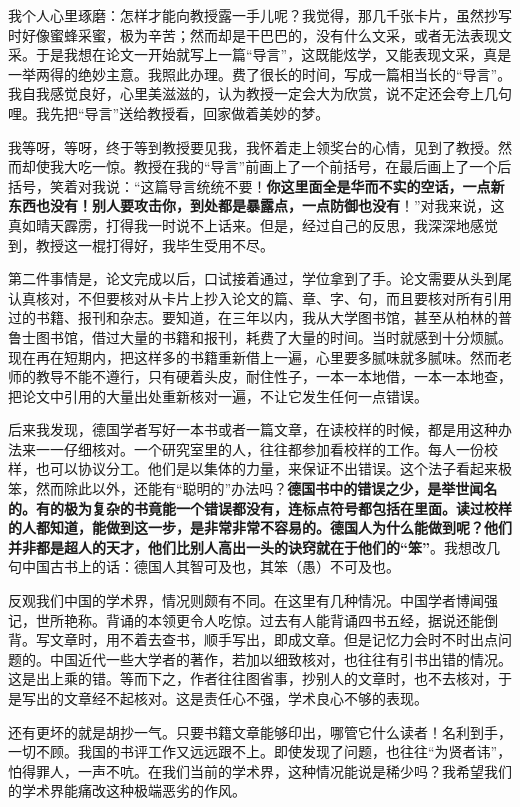 \documentclass[UTF8,a4paper,8pt]{ctexbook}
\begin{document}
		我个人心里琢磨：怎样才能向教授露一手儿呢？我觉得，那几千张卡片，虽然抄写时好像蜜蜂采蜜，极为辛苦；然而却是干巴巴的，没有什么文采，或者无法表现文采。于是我想在论文一开始就写上一篇“导言”，这既能炫学，又能表现文采，真是一举两得的绝妙主意。我照此办理。费了很长的时间，写成一篇相当长的“导言”。我自我感觉良好，心里美滋滋的，认为教授一定会大为欣赏，说不定还会夸上几句哩。我先把“导言”送给教授看，回家做着美妙的梦。
		
		我等呀，等呀，终于等到教授要见我，我怀着走上领奖台的心情，见到了教授。然而却使我大吃一惊。教授在我的“导言”前画上了一个前括号，在最后画上了一个后括号，笑着对我说：“这篇导言统统不要！\textbf{你这里面全是华而不实的空话，一点新东西也没有！别人要攻击你，到处都是暴露点，一点防御也没有}！”对我来说，这真如晴天霹雳，打得我一时说不上话来。但是，经过自己的反思，我深深地感觉到，教授这一棍打得好，我毕生受用不尽。
		
		第二件事情是，论文完成以后，口试接着通过，学位拿到了手。论文需要从头到尾认真核对，不但要核对从卡片上抄入论文的篇、章、字、句，而且要核对所有引用过的书籍、报刊和杂志。要知道，在三年以内，我从大学图书馆，甚至从柏林的普鲁士图书馆，借过大量的书籍和报刊，耗费了大量的时间。当时就感到十分烦腻。现在再在短期内，把这样多的书籍重新借上一遍，心里要多腻味就多腻味。然而老师的教导不能不遵行，只有硬着头皮，耐住性子，一本一本地借，一本一本地查，把论文中引用的大量出处重新核对一遍，不让它发生任何一点错误。
		
		后来我发现，德国学者写好一本书或者一篇文章，在读校样的时候，都是用这种办法来一一仔细核对。一个研究室里的人，往往都参加看校样的工作。每人一份校样，也可以协议分工。他们是以集体的力量，来保证不出错误。这个法子看起来极笨，然而除此以外，还能有“聪明的”办法吗？\textbf{德国书中的错误之少，是举世闻名的。有的极为复杂的书竟能一个错误都没有，连标点符号都包括在里面。读过校样的人都知道，能做到这一步，是非常非常不容易的。德国人为什么能做到呢？他们并非都是超人的天才，他们比别人高出一头的诀窍就在于他们的“笨”}。我想改几句中国古书上的话：德国人其智可及也，其笨（愚）不可及也。
		
		反观我们中国的学术界，情况则颇有不同。在这里有几种情况。中国学者博闻强记，世所艳称。背诵的本领更令人吃惊。过去有人能背诵四书五经，据说还能倒背。写文章时，用不着去查书，顺手写出，即成文章。但是记忆力会时不时出点问题的。中国近代一些大学者的著作，若加以细致核对，也往往有引书出错的情况。这是出上乘的错。等而下之，作者往往图省事，抄别人的文章时，也不去核对，于是写出的文章经不起核对。这是责任心不强，学术良心不够的表现。
		
		还有更坏的就是胡抄一气。只要书籍文章能够印出，哪管它什么读者！名利到手，一切不顾。我国的书评工作又远远跟不上。即使发现了问题，也往往“为贤者讳”，怕得罪人，一声不吭。在我们当前的学术界，这种情况能说是稀少吗？我希望我们的学术界能痛改这种极端恶劣的作风。
		
\end{document}
